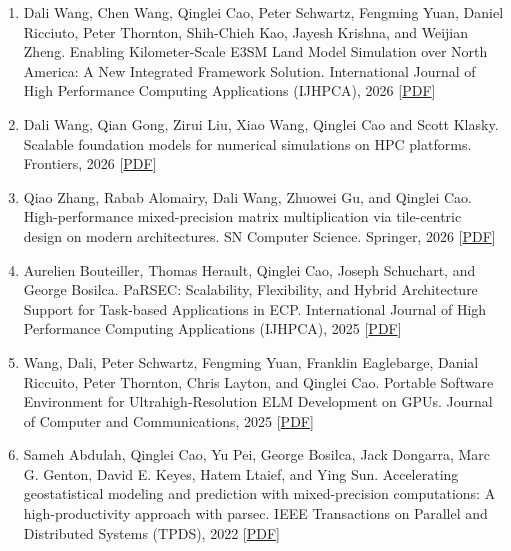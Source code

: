 \documentclass{resume} %
\let\OrigRSection\rSection
\let\OrigEndRSection\endrSection
\let\OrigMakeUppercase\MakeUppercase
\renewenvironment{rSection}[1]{
    \renewcommand{\MakeUppercase}[1]{\textcolor{blue}{\OrigMakeUppercase{##1}}}%
    \OrigRSection{#1}%
}{%
    \OrigEndRSection%
}
\begin{document}
\begin{rSection}{\faBook~Publications}
\begin{itemize}
  \begin{enumerate}[leftmargin=8pt, align=left]%
    \item Dali Wang, Chen Wang, Qinglei Cao, Peter Schwartz, Fengming Yuan, Daniel Ricciuto, Peter Thornton, Shih-Chieh Kao, Jayesh Krishna, and Weijian Zheng. Enabling Kilometer-Scale E3SM Land Model Simulation over North America: A New Integrated Framework Solution. International Journal of High Performance Computing Applications (IJHPCA), 2026 \hfill[\href{https://qingleicao.com/papers/Enabling Kilometer-Scale E3SM Land Model Simulation over North America A New Integrated Framework Solution.pdf}{PDF}]
    \item Dali Wang, Qian Gong, Zirui Liu, Xiao Wang, Qinglei Cao and Scott Klasky. Scalable foundation models for numerical simulations on HPC platforms. Frontiers, 2026 \hfill[\href{https://qingleicao.com/papers/Scalable foundation models for numerical simulations on HPC platforms.pdf}{PDF}]
    \item Qiao Zhang, Rabab Alomairy, Dali Wang, Zhuowei Gu, and Qinglei Cao. High-performance mixed-precision matrix multiplication via tile-centric design on modern architectures. SN Computer Science. Springer, 2026 \hfill[\href{https://qingleicao.com/papers/High-Performance Mixed-Precision Matrix Multiplication via TileCentric Design on Modern Architectures.pdf}{PDF}]
    \item Aurelien Bouteiller, Thomas Herault, Qinglei Cao, Joseph Schuchart, and George Bosilca. PaRSEC: Scalability, Flexibility, and Hybrid Architecture Support for Task-based Applications in ECP. International Journal of High Performance Computing Applications (IJHPCA), 2025 \hfill[\href{https://dl.acm.org/doi/10.1177/10943420241290520}{PDF}]
    \item Wang, Dali, Peter Schwartz, Fengming Yuan, Franklin Eaglebarge, Danial Riccuito, Peter Thornton, Chris Layton, and Qinglei Cao. Portable Software Environment for Ultrahigh-Resolution ELM Development on GPUs. Journal of Computer and Communications, 2025 \hfill[\href{https://www.scirp.org/journal/paperinformation?paperid=140718}{PDF}]
    \item Sameh Abdulah, Qinglei Cao, Yu Pei, George Bosilca, Jack Dongarra, Marc G. Genton, David E. Keyes, Hatem Ltaief, and Ying Sun. Accelerating geostatistical modeling and prediction with mixed-precision computations: A high-productivity approach with parsec. IEEE Transactions on Parallel and Distributed Systems ({TPDS}), 2022 \hfill[\href{https://qingleicao.com/papers/Accelerating Geostatistical Modeling and Prediction With Mixed-Precision Computations- A High-Productivity Approach with PaRSEC.pdf}{PDF}]

\end{enumerate}
\end{itemize}
\end{rSection}
\end{document}
